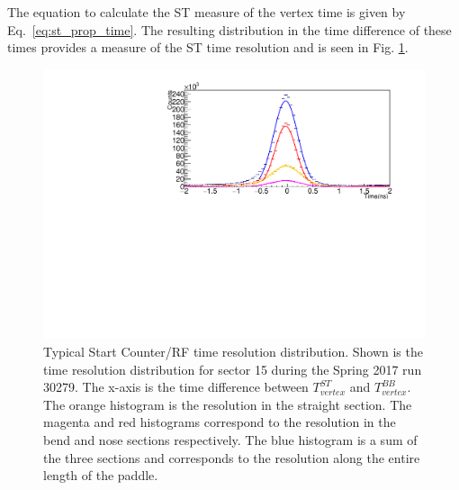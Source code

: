 The equation to calculate the ST measure of the vertex time is given by Eq.~\ref{eq:st_prop_time}.  
The resulting distribution in the time difference of these times provides a measure of the ST time resolution and is seen in Fig. \ref{fig:beam_tof_corr_chan_15}.
	\begin{figure}[!htb]
		\centering
		\includegraphics[width=1.08\linewidth]{performance/figs/TR_15}
		\caption[Typical Start Counter/RF time resolution distribution]{Typical Start Counter/RF time resolution distribution.  Shown is the time resolution distribution for sector 15 during the Spring 2017 run 30279. The x-axis is the time difference between $T^{ST}_{vertex}$ and $T^{BB}_{vertex}$. The orange histogram is the resolution in the straight section. The magenta and red histograms correspond to the resolution in the bend and nose sections respectively. The blue histogram is a sum of the three sections and corresponds to the resolution along the entire length of the paddle.}
		\label{fig:beam_tof_corr_chan_15}
	\end{figure}
	
